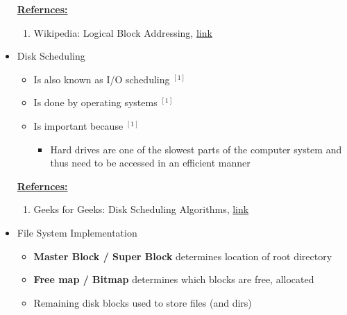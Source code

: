 \documentclass[12pt]{article}
\begin{document}
\begin{itemize}
    \bigskip

    \underline{\textbf{Refernces:}}

    \bigskip

    \begin{enumerate}[1)]
        \item Wikipedia: Logical Block Addressing, \href{https://en.wikipedia.org/wiki/Logical_block_addressing}{link}
    \end{enumerate}

    \item Disk Scheduling
    \begin{itemize}
        \item Is also known as I/O scheduling $^{[1]}$
        \item Is done by operating systems $^{[1]}$
        \item Is important because $^{[1]}$
        \begin{itemize}
            \item Hard drives are one of the slowest parts of the computer system
            and thus need to be accessed in an efficient manner
        \end{itemize}
    \end{itemize}

    \bigskip

    \underline{\textbf{Refernces:}}

    \bigskip

    \begin{enumerate}[1)]
        \item Geeks for Geeks: Disk Scheduling Algorithms, \href{https://www.geeksforgeeks.org/disk-scheduling-algorithms/}{link}
    \end{enumerate}
    \item File System Implementation
    \begin{itemize}
        \item \textbf{Master Block / Super Block} determines location of root directory
        \item \textbf{Free map / Bitmap} determines which blocks are free, allocated
        \item Remaining disk blocks used to store files (and dirs)


\end{itemize}
\end{itemize}
\end{document}
